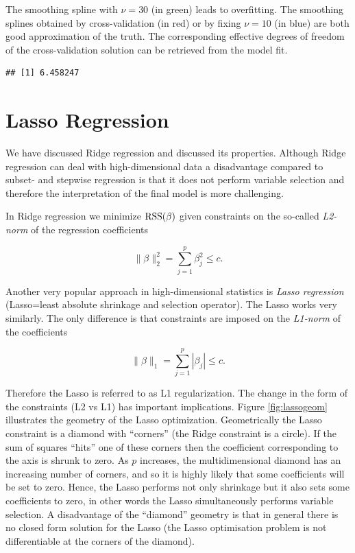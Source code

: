 \documentclass[
]{book}
\newenvironment{Shaded}{\begin{snugshade}}{\end{snugshade}}
\newcommand{\NormalTok}[1]{#1}
\newcommand{\SpecialCharTok}[1]{\textcolor[rgb]{0.00,0.00,0.00}{#1}}
\begin{document}
The smoothing spline with \(\nu=30\) (in green) leads to overfitting. The smoothing splines obtained by cross-validation (in red) or by fixing \(\nu=10\) (in blue) are both good approximation of the truth. The corresponding effective degrees of freedom of the cross-validation solution can be retrieved from the model fit.

\begin{Shaded}
\end{Shaded}

\begin{verbatim}
## [1] 6.458247
\end{verbatim}

\hypertarget{lasso-regression}{%
\section{Lasso Regression}\label{lasso-regression}}

We have discussed Ridge regression and discussed its properties. Although Ridge regression can deal with high-dimensional data a disadvantage compared to subset- and stepwise regression is that it does not perform variable selection and therefore the interpretation of the final model is more challenging.

In Ridge regression we minimize \(\rm RSS(\beta)\) given constraints on the so-called \emph{L2-norm} of the regression coefficients

\[\|\beta\|^2_2=\sum_{j=1}^p \beta^2_j \leq c.\]

Another very popular approach in high-dimensional statistics is \emph{Lasso regression} (Lasso=least absolute shrinkage and selection operator). The Lasso works very similarly. The only difference is that constraints are imposed on the \emph{L1-norm} of the coefficients

\[\|\beta\|_1=\sum_{j=1}^p |\beta_j| \leq c.\]

Therefore the Lasso is referred to as L1 regularization. The change in the form of the constraints (L2 vs L1) has important implications. Figure \ref{fig:lassogeom} illustrates the geometry of the Lasso optimization. Geometrically the Lasso constraint is a diamond with ``corners'' (the Ridge constraint is a circle). If the sum of squares ``hits'' one of these corners then the coefficient corresponding to the axis is shrunk to zero. As \(p\) increases, the multidimensional diamond has an increasing number of corners, and so it is highly likely that some coefficients will be set to zero. Hence, the Lasso performs not only shrinkage but it also sets some coefficients to zero, in other words the Lasso simultaneously performs variable selection. A disadvantage of the ``diamond'' geometry is that in general there is no closed form solution for the Lasso (the Lasso optimisation problem is not differentiable at the corners of the diamond).
\end{document}
